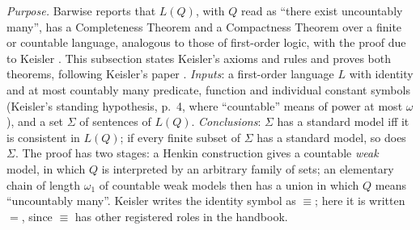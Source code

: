 \emph{Purpose.}  Barwise reports that \(L(Q)\), with \(Q\) read as ``there
exist uncountably many'', has a Completeness Theorem and a Compactness
Theorem over a finite or countable language, analogous to those of
first-order logic, with the proof due to Keisler
\cite[ch.~A.1, \S5, pp.~44--45]{Barwise1977FirstOrder}.  This subsection
states Keisler's axioms and rules and proves both theorems, following
Keisler's paper \cite[\S\S1--2, pp.~4--27]{Keisler1970}.  \emph{Inputs}: a
first-order language \(L\) with identity and at most countably many
predicate, function and individual constant symbols (Keisler's standing
hypothesis, p.~4, where ``countable'' means of power at most \(\omega\)),
and a set \(\Sigma\) of sentences of \(L(Q)\).  \emph{Conclusions}:
\(\Sigma\) has a standard model iff it is consistent in \(L(Q)\); if every
finite subset of \(\Sigma\) has a standard model, so does \(\Sigma\).  The
proof has two stages: a Henkin construction gives a countable \emph{weak}
model, in which \(Q\) is interpreted by an arbitrary family of sets; an
elementary chain of length \(\omega_1\) of countable weak models then has a
union in which \(Q\) means ``uncountably many''.  Keisler writes the
identity symbol as \(\equiv\); here it is written \(=\), since \(\equiv\)
has other registered roles in the handbook.

